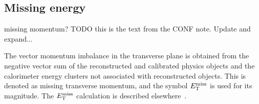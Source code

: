 \FloatBarrier
\subsection{Missing energy} 
\label{sec:met}

{\color{red} missing momentum?}
{\color{red} TODO this is the text from the CONF note. Update and expand...}

The vector momentum imbalance in the transverse plane is obtained from
the negative vector sum of the reconstructed and calibrated physics
objects and the calorimeter energy clusters not associated with reconstructed
objects. This is denoted as missing transverse momentum, and the symbol
$E_{\mathrm{T}}^{\mathrm{miss}}$ is used for its magnitude.  The $E_{\mathrm{T}}^{\mathrm{miss}}$ calculation is described
elsewhere~\cite{ATLAS-CONF-2013-082}.
